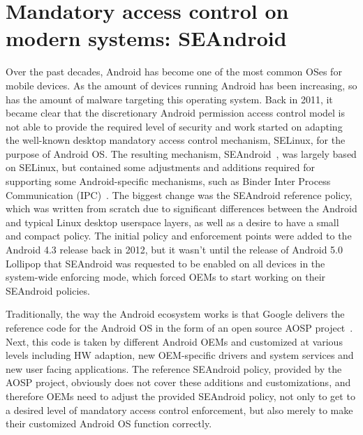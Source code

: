 \section{Mandatory access control on modern systems: SEAndroid}

Over the past decades, Android has become one of the most common OSes for mobile devices. As the amount of devices running Android has been increasing, so has the amount of malware targeting this operating system. Back in 2011, it became clear that the discretionary Android permission access control model is not able to provide the required level of security and work started on adapting the well-known desktop mandatory access control mechanism, SELinux, for the purpose of Android OS. The resulting mechanism, SEAndroid~\cite{smalley12}, was largely based on SELinux, but contained some adjustments and additions required for supporting some Android-specific mechanisms, such as Binder Inter Process Communication (IPC)~\cite{binder}. The biggest change was the SEAndroid reference policy, which was written from scratch due to significant differences between the Android and typical Linux desktop userspace layers, as well as a desire to have a small and compact policy. The initial policy and enforcement points were added to the Android 4.3 release back in 2012, but it wasn't until the release of Android 5.0 Lollipop that SEAndroid was requested to be enabled on all devices in the system-wide enforcing mode, which forced OEMs to start working on their SEAndroid policies. 

Traditionally, the way the Android ecosystem works is that Google delivers the reference code for the Android OS in the form of an open source AOSP project~\cite{aosp}. Next, this code is taken by different Android OEMs and customized at various levels including HW adaption, new OEM-specific drivers and system services and new user facing applications. The reference SEAndroid policy, provided by the AOSP project, obviously does not cover these additions and customizations, and therefore OEMs need to adjust the provided SEAndroid policy, not only to get to a desired level of mandatory access control enforcement, but also merely to make their customized Android OS function correctly.

